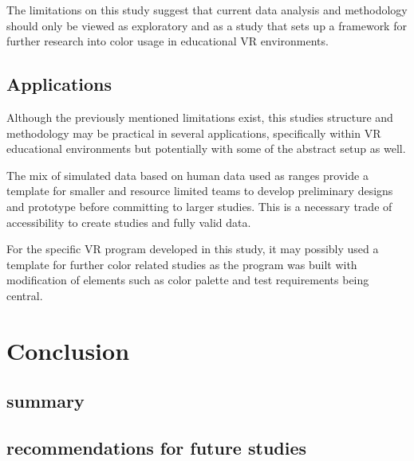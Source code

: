\documentclass[acmlarge]{acmart}
\begin{document}
The limitations on this study suggest that current data analysis and methodology should only be viewed as exploratory and as a study that sets up a framework for further research into color usage in educational VR environments.

\subsection{Applications}
Although the previously mentioned limitations exist, this studies structure and methodology may be practical in several applications, specifically within VR educational environments but potentially with some of the abstract setup as well.

The mix of simulated data based on human data used as ranges provide a template for smaller and resource limited teams to develop preliminary designs and prototype before committing to larger studies. This is a necessary trade of accessibility to create studies and fully valid data.

For the specific VR program developed in this study, it may possibly used a template for further color related studies as the program was built with modification of elements such as color palette and test requirements being central.

\section{Conclusion}
\subsection{summary}
\subsection{recommendations for future studies}






\end{document}
